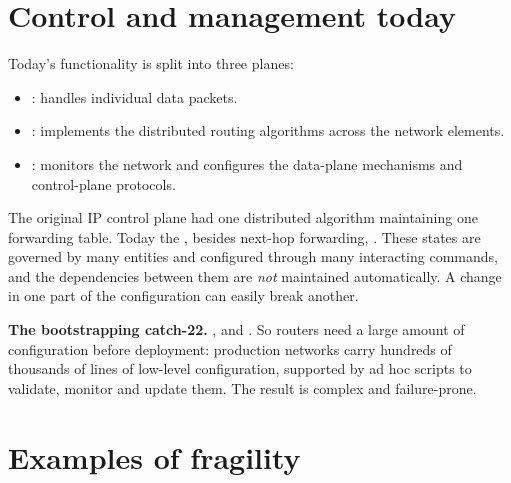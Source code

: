 \section{Control and management today}
Today's functionality is split into three planes:
\begin{itemize}
\item {}: handles individual data packets.
\item {}: implements the distributed routing algorithms across the network elements.
\item {}: monitors the network and configures the data-plane mechanisms and control-plane protocols.
\end{itemize}
The original IP control plane had one distributed algorithm maintaining one forwarding table. Today the , besides next-hop forwarding, . These states are governed by many entities and configured through many interacting commands, and the dependencies between them are \emph{not} maintained automatically. A change in one part of the configuration can easily break another.

\textbf{The bootstrapping catch-22.} , and . So routers need a large amount of configuration before deployment: production networks carry hundreds of thousands of lines of low-level configuration, supported by ad hoc scripts to validate, monitor and update them. The result is complex and failure-prone.

\section{Examples of fragility}
